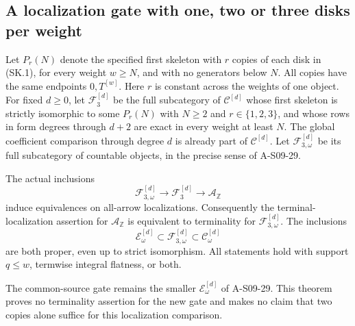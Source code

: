 \subsection{A localization gate with one, two or three disks per weight}

Let $P_r(N)$ denote the specified first skeleton with $r$ copies
of each disk in (SK.1), for every weight $w\geq N$, and with
no generators below $N$. All copies have the same endpoints
$0,T^{[w]}$. Here $r$ is constant across the weights of one
object. For fixed $d\geq0$, let $\mathcal F_3^{[d]}$ be the
full subcategory of $\mathcal C^{[d]}$ whose first skeleton is
strictly isomorphic to some $P_r(N)$ with $N\geq2$ and
$r\in\{1,2,3\}$, and whose rows in form degrees through
$d+2$ are exact in every weight at least $N$.
The global coefficient comparison through degree $d$ is
already part of $\mathcal C^{[d]}$.
Let $\mathcal F_{3,\omega}^{[d]}$ be its full subcategory of
countable objects, in the precise sense of A-S09-29.

\begin{theorem}
\label{AS0930}
The actual inclusions
\[
 \mathcal F_{3,\omega}^{[d]}
       \longrightarrow\mathcal F_3^{[d]}
       \longrightarrow\mathcal A_{\mathbb Z}
 \tag{S09.161}
\]
induce equivalences on all-arrow localizations.
Consequently the terminal-localization assertion for
$\mathcal A_{\mathbb Z}$ is equivalent to terminality for
$\mathcal F_{3,\omega}^{[d]}$.
The inclusions
\[
 \mathcal E_\omega^{[d]}
       \subset\mathcal F_{3,\omega}^{[d]}
       \subset\mathcal C_\omega^{[d]}
 \tag{S09.162}
\]
are both proper, even up to strict isomorphism.
All statements hold with support $q\leq w$, termwise
integral flatness, or both.

The common-source gate remains the smaller
$\mathcal E_\omega^{[d]}$ of A-S09-29. This theorem proves
no terminality assertion for the new gate and makes no
claim that two copies alone suffice for this localization
comparison.
\end{theorem}

